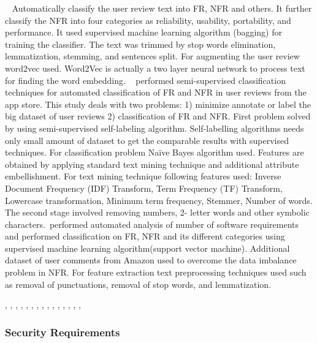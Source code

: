 \etal~\cite{} Automatically classify the user review text into FR, NFR and others. It further classify the NFR into four categories as reliability, usability, portability, and performance. It used supervised machine learning algorithm (bagging) for training the classifier. The text was trimmed by stop words elimination, lemmatization, stemming, and sentences split. For augmenting the user review word2vec used. Word2Vec is actually a two layer neural network to process text for finding the word embedding. \etal~\cite {Deocadez:2017} performed semi-supervised classification techniques for automated classification of FR and NFR in user reviews from the app store. This study deals with two problems: 1) minimize annotate or label the big dataset of user reviews 2) classification of FR and NFR. First problem solved by using semi-supervised self-labeling algorithm. Self-labelling algorithms needs only small amount of dataset to get the comparable results with supervised techniques. For classification problem Naïve Bayes algorithm used. Features are obtained by applying standard text mining technique and additional attribute embellishment. For text mining technique following features used:  Inverse Document Frequency (IDF) Transform, Term Frequency (TF) Transform, Lowercase transformation, Minimum term frequency, Stemmer, Number of words. The second stage involved removing numbers, 2- letter words and other symbolic characters.\etal~\cite{Kurtanovic:2017}performed automated analysis of number of software requirements and performed classification on FR, NFR and its different categories using supervised machine learning algorithm(support vector machine). Additional dataset of user comments from Amazon used to overcome the data imbalance problem in NFR. For feature extraction text preprocessing techniques used such as removal of punctuations, removal of stop words, and lemmatization. 

\cite{Deocadez:2017}, \cite{Kurtanovic:2017}, \cite{Guzman:2017},
\cite{Abad:2017}, \cite{Dekhtyar:2017}, \cite{Rashwan:2012}, \cite{Lu:2017},
\cite{Hayes:2014}, \cite{Williams:2017}, \cite{Garzoli:2013},
\cite{Casamayor:2010}, \cite{Wang:2016}, \cite{Hussain:2012}, \cite{Jiang:2014},
\cite{Jha:2017}, \cite{Pinquie:2015}

\subsubsection{Security Requirements} 

